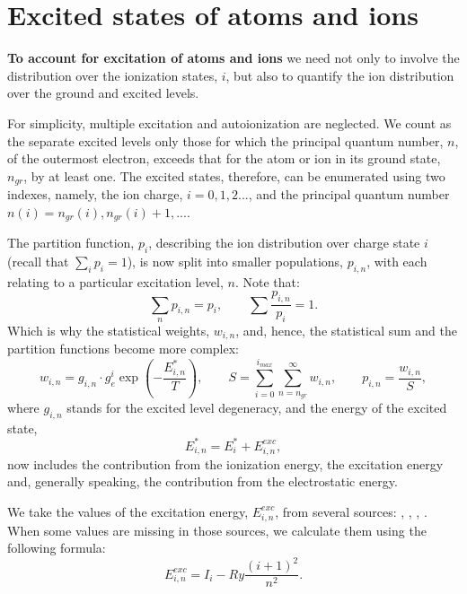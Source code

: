 \section{Excited states of atoms and ions}
{\bf To account for excitation of atoms and ions} we need not only to involve the
distribution over the ionization states, $i$, but also to quantify the
ion distribution over the ground and 
excited levels. 

For simplicity,  multiple excitation and autoionization are neglected. We
count as the separate excited levels only those for which the principal 
quantum number, 
$n$, of the outermost electron, exceeds that for the atom or ion in its ground state, 
$n_{gr}$, by at least one. The excited states, therefore, can be enumerated using two indexes,
namely, the ion charge, $i=0,1,2...$, and the principal quantum number 
$n(i)=n_{gr}(i),n_{gr}(i)+1,...$. 

The partition function, $p_i$, describing the ion distribution over charge state $i$ 
(recall that $\sum_i{p_i}=1$), 
is now split into smaller populations, $p_{i,n}$, with each relating to a particular 
excitation level, $n$. Note that:
\begin{equation}
\sum_n{p_{i,n}}=p_i,\qquad \sum{\frac{p_{i,n}}{p_i}}=1.	
\end{equation}
Which is why the statistical weights, $w_{i,n}$, and, hence, the statistical sum and the partition functions
become more complex:
\begin{equation}
w_{i,n} = g_{i,n} \cdot g_e^i \exp \left( -\frac{E^*_{i,n}}{T} \right),\qquad
S = \sum_{i=0}^{i_{max}} \sum_{n=n_{gr}}^{\infty} w_{i,n},\qquad
p_{i,n} = \frac{w_{i,n}}{S},
\end{equation}
where $g_{i,n}$ stands for the excited level degeneracy, and the energy of the excited state,
\begin{equation}
E^*_{i,n}=E^*_i + E^{exc}_{i,n},
\end{equation} 
now includes the contribution from the ionization energy, the excitation energy and, generally 
speaking, the contribution from the electrostatic energy.

We take the values of the excitation energy, $E^{exc}_{i,n}$, from several sources:
\cite{spectrw3}, \cite{nistdb}, \cite{RefAlMartin}, \cite{RefXeSaloman}.
When some values are missing in those sources, we calculate them using the following formula:
\begin{equation}\label{estarin}
E^{exc}_{i,n} = I_i - Ry \frac{(i+1)^2}{n^2}.
\end{equation}

